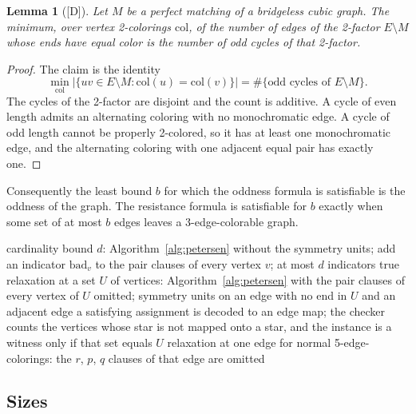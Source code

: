 \documentclass[11pt]{article}
\newtheorem{lemma}[theorem]{Lemma}
\theoremstyle{definition}
\theoremstyle{remark}
\newcommand{\dd}{\textup{[D]}}
\begin{document}
\begin{lemma}[\dd]\label{lem:oddness}
Let $M$ be a perfect matching of a bridgeless cubic graph. The minimum, over vertex 2-colorings
$\mathrm{col}$, of the number of edges of the 2-factor $E \setminus M$ whose ends have equal color is the
number of odd cycles of that 2-factor.
\end{lemma}

\begin{proof}
The claim is the identity
\begin{equation}\label{eq:oddness}
\min_{\mathrm{col}} \bigl|\{uv \in E \setminus M : \mathrm{col}(u) = \mathrm{col}(v)\}\bigr| = \#\{\text{odd cycles of } E \setminus M\}.
\end{equation}
The cycles of the 2-factor are disjoint and the count is additive. A cycle of even length admits an
alternating coloring with no monochromatic edge. A cycle of odd length cannot be properly 2-colored,
so it has at least one monochromatic edge, and the alternating coloring with one adjacent equal pair
has exactly one.
\end{proof}

Consequently the least bound $b$ for which the oddness formula is satisfiable is the oddness of the
graph. The resistance formula is satisfiable for $b$ exactly when some set of at most $b$ edges
leaves a 3-edge-colorable graph.

\begin{algorithm}[htbp]
\caption{Petersen defect by cardinality and by designated relaxation (EXP-004, EXP-006, EXP-008)}\label{alg:defect}
\begin{algorithmic}[1]
\State cardinality bound $d$: Algorithm~\ref{alg:petersen} without the symmetry units; add an indicator $\mathrm{bad}_v$ to the pair clauses of every vertex $v$; at most $d$ indicators true
\State relaxation at a set $U$ of vertices: Algorithm~\ref{alg:petersen} with the pair clauses of every vertex of $U$ omitted; symmetry units on an edge with no end in $U$ and an adjacent edge
\State a satisfying assignment is decoded to an edge map; the checker counts the vertices whose star is not mapped onto a star, and the instance is a witness only if that set equals $U$
\State relaxation at one edge for normal 5-edge-colorings: the $r$, $p$, $q$ clauses of that edge are omitted
\end{algorithmic}
\end{algorithm}

\subsection{Sizes}
\end{document}
